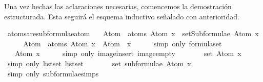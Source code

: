 \begin{isabellebody}
\begin{isamarkuptext}
  Una vez hechas las aclaraciones necesarias, comencemos la demostración 
  estructurada. Esta seguirá el esquema inductivo señalado con 
  anterioridad.%
\end{isamarkuptext}\isamarkuptrue%
\isamarkupfalse%
\ atoms{\isacharunderscore}are{\isacharunderscore}subformulae{\isacharunderscore}atom{\isacharcolon}\ \isanewline
\ \ {\isachardoublequoteopen}Atom\ {\isacharbackquote}\ atoms\ {\isacharparenleft}Atom\ x{\isacharparenright}\ {\isasymsubseteq}\ setSubformulae\ {\isacharparenleft}Atom\ x{\isacharparenright}{\isachardoublequoteclose}\ \isanewline
%
\isadelimproof
%
\endisadelimproof
%
\isatagproof
{}\isamarkupfalse%
\ {\isacharminus}\isanewline
\ \ \isamarkupfalse%
\ {\isachardoublequoteopen}Atom\ {\isacharbackquote}\ atoms\ {\isacharparenleft}Atom\ x{\isacharparenright}\ {\isacharequal}\ Atom\ {\isacharbackquote}\ {\isacharbraceleft}x{\isacharbraceright}{\isachardoublequoteclose}\isanewline
\ \ \ \ \isamarkupfalse%
\ {\isacharparenleft}simp\ only{\isacharcolon}\ formula{\isachardot}set{\isacharparenleft}{}{\isacharparenright}{\isacharparenright}\isanewline
\ \ \isamarkupfalse%
\ \isamarkupfalse%
\ {\isachardoublequoteopen}{\isasymdots}\ {\isacharequal}\ {\isacharbraceleft}Atom\ x{\isacharbraceright}{\isachardoublequoteclose}\isanewline
\ \ \ \ \isamarkupfalse%
\ {\isacharparenleft}simp\ only{\isacharcolon}\ image{\isacharunderscore}insert\ image{\isacharunderscore}empty{\isacharparenright}\isanewline
\ \ \isamarkupfalse%
\ \isamarkupfalse%
\ {\isachardoublequoteopen}{\isasymdots}\ {\isacharequal}\ set\ {\isacharbrackleft}Atom\ x{\isacharbrackright}{\isachardoublequoteclose}\isanewline
\ \ \ \ \isamarkupfalse%
\ {\isacharparenleft}simp\ only{\isacharcolon}\ list{\isachardot}set{\isacharparenleft}{}{\isacharparenright}\ list{\isachardot}set{\isacharparenleft}{}{\isacharparenright}{\isacharparenright}\isanewline
\ \ \isamarkupfalse%
\ \isamarkupfalse%
\ {\isachardoublequoteopen}{\isasymdots}\ {\isacharequal}\ set\ {\isacharparenleft}subformulae\ {\isacharparenleft}Atom\ x{\isacharparenright}{\isacharparenright}{\isachardoublequoteclose}\isanewline
\ \ \ \ \isamarkupfalse%
\ {\isacharparenleft}simp\ only{\isacharcolon}\ subformulae{\isachardot}simps{\isacharparenleft}{}{\isacharparenright}{\isacharparenright}\isanewline
\ \ \isamarkupfalse%
\ \isamarkupfalse%

\end{isabellebody}
